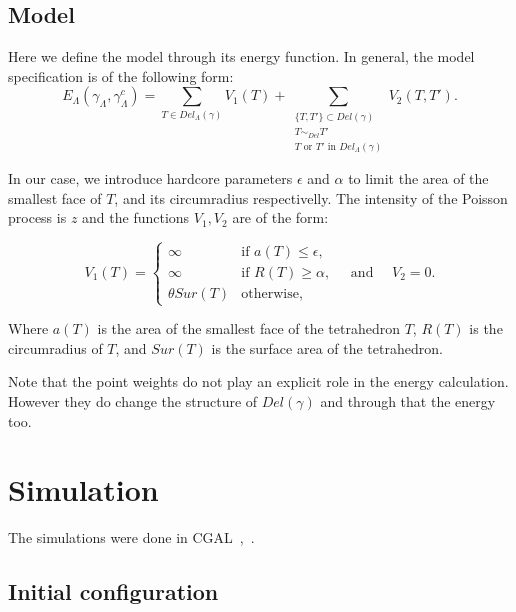 \documentclass[12pt,a4paper]{report}
\begin{document}
\subsection{Model}
Here we define the model through its energy function. In general, the model specification is of the following form:
$$E_\Lambda(\gamma_\Lambda, \gamma_\Lambda^c)= \sum_{T \in Del_\Lambda(\gamma)} V_1(T) + \sum_{\substack{\{T,T'\} \subset Del(\gamma) \\ T\sim_{Del} T' \\ T \text{ or  } T' \text{ in  } Del_\Lambda(\gamma)}} V_2(T,T').$$

In our case, we introduce hardcore parameters $\epsilon$ and $\alpha$ to limit the area of the smallest face of $T$, and its circumradius respectivelly. The intensity of the Poisson process is $z$ and the functions $V_1, V_2$ are of the form:


$$V_1(T) = 
\left\{
    \begin{array}{ll}
        \infty & \mbox{if } a(T)\leq \epsilon, \\
        \infty & \mbox{if } R(T)\geq \alpha, \\
        \theta Sur(T) & \mbox{otherwise, }
    \end{array}
\right. \quad \mbox{and } \quad V_2 = 0.$$

Where $a(T)$ is the area of the smallest face of the tetrahedron $T$, $R(T)$ is the circumradius of $T$, and $Sur(T)$ is the surface area of the tetrahedron.

Note that the point weights do not play an explicit role in the energy calculation. However they do change the structure of $Del(\gamma)$ and through that the energy too.




\section{Simulation}
The simulations were done in CGAL~\cite{cgal},~\cite{cgal:3d-triang}.
\subsection{Initial configuration}
\end{document}
